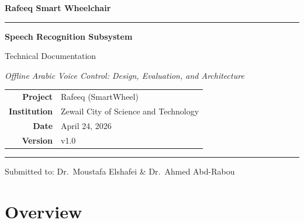 \documentclass[12pt, a4paper]{report}
\begin{document}
\begin{titlepage}
  \centering
  \vspace*{2cm}

  {\fontsize{28}{34}\selectfont\bfseries\color{navyblue}
    Rafeeq Smart Wheelchair\par}

  \vspace{0.4cm}
  {\color{steelblue}\rule{0.8\textwidth}{2pt}\par}
  \vspace{0.4cm}

  {\Large\bfseries\color{darkgray}
    Speech Recognition Subsystem\par
    Technical Documentation\par}

  \vspace{0.6cm}
  {\normalsize\itshape\color{darkgray}
    Offline Arabic Voice Control: Design, Evaluation, and Architecture\par}

  \vspace{2.5cm}

  \begin{tabular}{rl}
    \textbf{Project}      & Rafeeq (SmartWheel) \\[4pt]
    \textbf{Institution}  & Zewail City of Science and Technology \\[4pt]
    \textbf{Date}         & April 24, 2026 \\[4pt]
    \textbf{Version}      & v1.0 \\
  \end{tabular}

  \vfill
  {\color{steelblue}\rule{0.8\textwidth}{1pt}\par}
  \vspace{0.3cm}
  {\small\color{darkgray}
    Submitted to: Dr.\ Moustafa Elshafei \& Dr.\ Ahmed Abd-Rabou\par}
\end{titlepage}

\tableofcontents
\newpage

\chapter{Overview}
\end{document}
